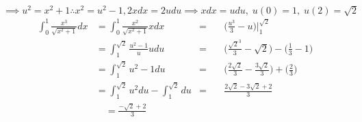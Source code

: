 $\implies u^2=x^2+1\therefore            x^2=u^2-1, 2xdx=2udu\implies  xdx=udu,   \;u(0)=1,\;u(2)=\sqrt{2}                                                                                    $
\begin{align*}
	\int_{0}^{1}\frac{x^3}{\sqrt{x^2+1}}dx & =\int_{0}^{1}\frac{x^2}{\sqrt{x^2+1}}xdx        & = & \quad \bigg(\frac{u^3}{3}-u\bigg)\bigg|_1^{\sqrt{2}}                              \\
	                                       & =\int_{1}^{\sqrt{2}}\frac{u^2-1}{u}udu          & = & \quad \bigg(\frac{\sqrt{2}^3}{3}-\sqrt{2}\bigg)-\bigg(\frac{1}{3}-1\bigg)         \\
	                                       & =\int_{1}^{\sqrt{2}}u^2-1du                     & = & \quad \bigg(\frac{2\sqrt{2}}{3}-\frac{3\sqrt{2}}{3}\bigg)+\bigg(\frac{2}{3}\bigg) \\
	                                       & =\int_{1}^{\sqrt{2}}u^2du-\int_{1}^{\sqrt{2}}du & = & \quad \frac{2\sqrt{2}-3\sqrt{2}+2}{3}                                             \\
	                                       & \quad  =\frac{-\sqrt{2}+2}{3}                                                                                                           \\
\end{align*}

